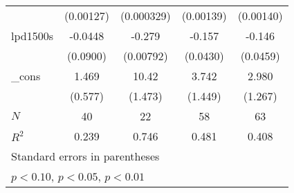 {\begin{tabular}{l*{4}{c}}
            &   (0.00127)         &  (0.000329)         &   (0.00139)         &   (0.00140)         \\
[1em]
lpd1500s    &     -0.0448         &      -0.279\sym{***}&      -0.157\sym{**} &      -0.146\sym{**} \\
            &    (0.0900)         &   (0.00792)         &    (0.0430)         &    (0.0459)         \\
[1em]
\_cons      &       1.469\sym{*}  &       10.42\sym{***}&       3.742\sym{**} &       2.980\sym{*}  \\
            &     (0.577)         &     (1.473)         &     (1.449)         &     (1.267)         \\
\hline
\(N\)       &          40         &          22         &          58         &          63         \\
\(R^{2}\)   &       0.239         &       0.746         &       0.481         &       0.408         \\
\hline\hline
\multicolumn{5}{l}{\footnotesize Standard errors in parentheses}\\
\multicolumn{5}{l}{\footnotesize \sym{*} \(p<0.10\), \sym{**} \(p<0.05\), \sym{***} \(p<0.01\)}\\
\end{tabular}
}
